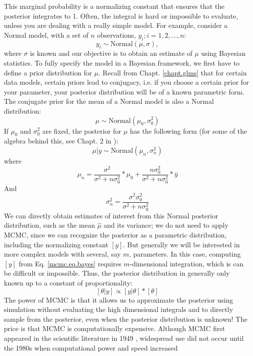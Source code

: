 This marginal probability is a normalizing constant that ensures that
the posterior integrates to 1. Often, the
integral is  hard or impossible to evaluate, unless you are
dealing with a really simple model.  For example, consider 
a Normal model, with a set of $n$ observations, $y_{i};
i=1,2,\ldots,n$: 
\[
 y_{i} \sim \mbox{Normal}(\mu, \sigma),
\]
where $\sigma$ is known and our objective is to obtain an estimate of
$\mu$ using Bayesian statistics. To fully specify the model in a Bayesian
framework, we first have to define a prior distribution for $\mu$. Recall
from Chapt. \ref{chapt.glms} 
that for certain data models, certain priors lead to
conjugacy, i.e. if you choose a certain prior for your parameter,
your posterior distribution will be of a known parametric form. The
conjugate prior for the mean of a Normal model is also a Normal
distribution:
\[
\mu \sim \mbox{Normal}(\mu_0, \sigma_{0}^{2})
\]
If $\mu_{0}$ and $\sigma_{0}^{2}$ are fixed, the posterior for $\mu$
has the following form (for some of the algebra behind this, see Chapt. 2 in \citet{gelman_etal:2004}):
\begin{equation}
\mu|y \sim \mbox{Normal}(\mu_{n}, \sigma_{n}^{2})
\label{mcmc.eq.mu-posterior}
\end{equation}
where
\[
\mu_{n} = \frac{ \sigma^{2}}  {\sigma^{2}   +n \sigma_{0}^{2}}*  \mu_0 +      \frac{n  \sigma_{0}^{2}}  {\sigma^{2}   +n \sigma_{0}^{2}} *\bar{y}
\]
And
\[
 \sigma_{n}^{2} = \frac{\sigma^{2}  \sigma_{0}^{2}} {\sigma^{2} + n \sigma_{0}^{2}}
\]
We can directly obtain estimates of interest from this Normal
posterior distribution, such as the mean $\hat{\mu}$ and its variance; we
do not need to apply MCMC, since we can recognize the posterior as a
parametric distribution, including the normalizing constant $[y]$.
But generally we will be interested in more complex models with
several, say $m$, parameters. In this case, computing $[y]$ from
Eq. \ref{mcmc.eq.bayes} requires $m$-dimensional integration, which is
can be difficult or impossible. Thus, the posterior distribution in
generally only known up to a constant of proportionality:
\[
[\theta|y] \propto [y|\theta] * [\theta]
\]
The power of MCMC is that it allows us to approximate the posterior
using simulation without evaluating the high dimensional integrals and
to directly sample from the posterior, even when the posterior
distribution is unknown! The price is that MCMC is computationally
expensive. Although MCMC first appeared in the scientific literature
in 1949 \citep{metropolis_etal:1949}, widespread use did not occur
until the 1980s when computational power and speed increased
